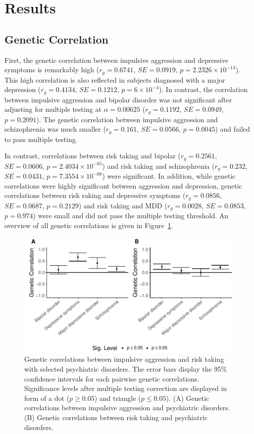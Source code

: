 \section{Results}
\label{sec:results_psych}

\subsection{Genetic Correlation}
\label{sub:psych_genetic_correlation}

First, the genetic correlation between impulsive aggression and depressive symptoms is remarkably high ($r_g=0.6741$, $SE=0.0919$, $p=2.2326\times 10^{-13}$).
This high correlation is also reflected in subjects diagnosed with a major depression ($r_g=0.4134$, $SE=0.1212$, $p=6\times 10^{-4}$).
In contrast, the correlation between impulsive aggression and bipolar disorder was not significant after adjusting for multiple testing at $\alpha=0.00625$ ($r_g=0.1192$, $SE=0.0949$, $p=0.2091$).
The genetic correlation between impulsive aggression and  schizophrenia was much smaller ($r_g=0.161$, $SE=0.0566$, $p=0.0045$) and failed to pass multiple testing.

In contrast, correlations between risk taking and bipolar ($r_g=0.2561$, $SE=0.0606$, $p=2.4034\times 10^{-05}$) and risk taking and schizophrenia ($r_g=0.232$, $SE=0.0431$, $p=7.3554\times 10^{-08}$) were significant.
In addition, while genetic correlations were highly significant between aggression and depression, genetic correlations between risk raking and depressive symptoms ($r_g=0.0856$, $SE=0.0687$, $p=0.2129$) and risk taking and  MDD ($r_g=0.0028$, $SE=0.0853$, $p=0.974$) were small and did not pass the multiple testing threshold. An  overview of all genetic correlations is given in Figure~\ref{fig:genetic_correlations_psych}.
\begin{figure}[htpb]
  \centering
  \includegraphics[width=0.8\linewidth]{ukb_psychiatric/figures/combined_corr.pdf}
  \caption[Genetic Correlations with Psychiatric Disorders]{Genetic correlations between impulsive aggression and risk taking with selected psychiatric disorders.
    The error bars display the 95\% confidence intervals for each pairwise genetic correlations.
    Significance levels after multiple testing correction are displayed in form of a dot ($p\ge 0.05$) and triangle ($p\leq0.05$).
    (A) Genetic correlations between impulsive aggression and psychiatric disorders. 
    (B) Genetic correlations between risk taking and psychiatric disorders.
  }\label{fig:genetic_correlations_psych}
\end{figure}


